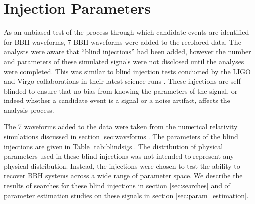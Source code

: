 \documentclass[12pt]{iopart}
\begin{document}
\section{Injection Parameters}
\label{sec:parameters}

As an unbiased test of the process through which candidate 
events are identified for BBH waveforms, 7 BBH waveforms were added to the 
recolored data. The analysts were aware that ``blind injections'' had been
added, however the number and parameters of these simulated signals were not 
disclosed until the analyses were completed. This was similar to blind 
injection tests conducted by the LIGO and Virgo collaborations in their latest 
science runs \cite{Colaboration:2011np}.
These injections are self-blinded to ensure that no bias from knowing the
parameters of the signal, or indeed whether a candidate event is a signal or a 
noise artifact, affects the analysis process.

The 7 waveforms added to the data were taken from the numerical
relativity simulations discussed in section \ref{sec:waveforms}. The parameters
of the blind injections are given in Table \ref{tab:blindsigs}. The distribution
of physical parameters used in these blind injections was not intended to
represent any physical distribution. Instead, the injections were chosen to 
test 
the ability
to recover BBH systems across a wide range of parameter space. We describe the 
results of searches for these blind injections in section \ref{sec:searches} 
and 
of parameter estimation studies on these signals in section 
\ref{sec:param_estimation}.
\end{document}

